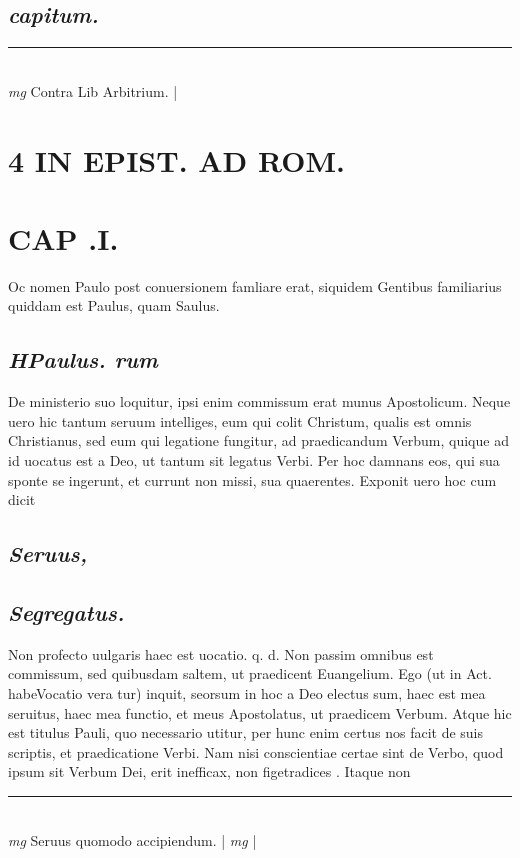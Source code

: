 \documentclass{article}
\begin{document}
\begin{pages}
\subsection*{\textit{capitum.  }}
\vspace{0.5cm}\noindent
\vspace{0.2cm}\rule{1cm}{0.2pt}\\ 
\hspace{0.2cm}\textit{mg}
\footnotesize Contra Lib Arbitrium. 
\normalsize| 
\section*{4 IN EPIST. AD ROM.  }
\marginpar{[ p.]}
\section{CAP .I.}\pstart Oc nomen Paulo post conuersionem famliare erat, siquidem Gentibus familiarius quiddam est Paulus, quam Saulus.   \pend
{}
{}
\subsection*{\textit{\huge\textbf{H}\normalsize Paulus. rum }}\pstart De ministerio suo loquitur, ipsi enim commissum erat munus Apostolicum. Neque uero hic tantum seruum intelliges, eum qui colit Christum, qualis est omnis Christianus, sed eum qui legatione fungitur, ad praedicandum Verbum, quique ad id uocatus est a Deo, ut tantum sit legatus Verbi. Per hoc damnans eos, qui sua sponte se ingerunt, et currunt non missi, sua quaerentes. Exponit uero hoc cum dicit  \pend
{}
{}
\subsection*{\textit{Seruus, }}
{}
\subsection*{\textit{Segregatus. }}\pstart Non profecto uulgaris haec est uocatio. q. d. Non passim omnibus est commissum, sed quibusdam saltem, ut praedicent Euangelium. Ego (ut in Act. habeVocatio vera tur) inquit, seorsum in hoc a Deo electus sum, haec est mea seruitus, haec mea functio, et meus Apostolatus, ut praedicem Verbum. Atque hic est titulus Pauli, quo necessario utitur, per hunc enim certus nos facit de suis scriptis, et praedicatione Verbi. Nam nisi conscientiae certae sint de Verbo, quod ipsum sit Verbum Dei, erit inefficax, non figetradices . Itaque non  \pend
\vspace{0.5cm}\noindent
\vspace{0.2cm}\rule{1cm}{0.2pt}\\ 
\hspace{0.2cm}\textit{mg}
\footnotesize Seruus quomodo accipiendum.  
\normalsize| 
\hspace{0.2cm}\textit{mg}
\footnotesize 
\normalsize| 

\end{pages}
\end{document}

